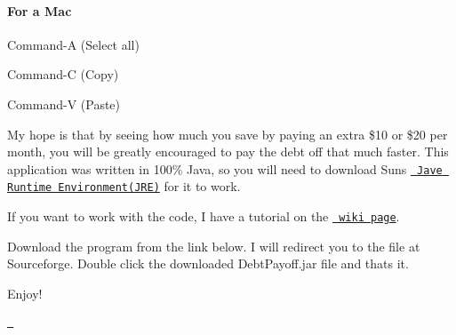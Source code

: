 \paragraph*{For a Mac}


\begin{DoxyItemize}
\item Command-\/A (Select all)
\item Command-\/C (Copy)
\item Command-\/V (Paste)
\end{DoxyItemize}

My hope is that by seeing how much you save by paying an extra \$10 or \$20 per month, you will be greatly encouraged to pay the debt off that much faster. This application was written in 100\% Java, so you will need to download Sun\textquotesingle{}s \href{https://www.java.com/en/download/}{\texttt{ Jave Runtime Environment(\+J\+R\+E)}} for it to work.

If you want to work with the code, I have a tutorial on the \href{https://github.com/aredshaw/DebtPayoff/wiki}{\texttt{ wiki page}}.

Download the program from the link below. I will redirect you to the file at Sourceforge. Double click the downloaded Debt\+Payoff.\+jar file and that\textquotesingle{}s it.

Enjoy!

\href{https://sourceforge.net/projects/debtpayoff/files/DebtPayoff/DebtPayoff-1.2.1/DebtPayoff.jar/download}{\texttt{  }} 
